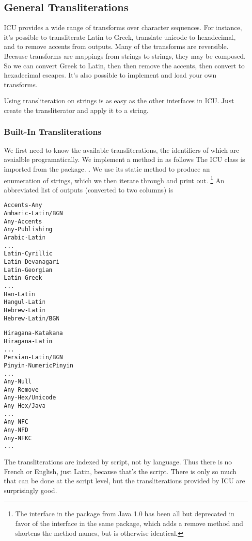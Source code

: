 \subsection{General Transliterations}\label{section:char-unicode-transliterate}

ICU provides a wide range of transforms over character sequences.  For
instance, it's possible to transliterate Latin to Greek, translate
unicode to hexadecimal, and to remove accents from outputs.  Many of
the transforms are reversible.  Because transforms are mappings from
strings to strings, they may be composed.  So we can convert Greek to
Latin, then then remove the accents, then convert to hexadecimal
escapes.  It's also possible to implement and load your own transforms.

Using transliteration on strings is as easy as the other interfaces in
ICU.  Just create the transliterator and apply it to a string.  

\subsubsection{Built-In Transliterations}

We first need to know the available transliterations, the identifiers
of which are avaialble programatically.  We implement a 
method in  as follows
%
%
The ICU  class is imported from the package.
.  We use its static method 
to produce an enumeration of strings, which we then iterate through
and print out.%
%
\footnote{The  interface in the package  
from Java 1.0 has been all but deprecated in favor of the
 interface in the same package, which adds a remove
method and shortens the method names, but is otherwise identical.}
%
An abbreviated list of outputs (converted to two columns) is
%
\begin{trivlist}
\item
\begin{minipage}[t]{0.45\textwidth}
\begin{verbatim}
Accents-Any
Amharic-Latin/BGN
Any-Accents
Any-Publishing
Arabic-Latin
...
Latin-Cyrillic
Latin-Devanagari
Latin-Georgian
Latin-Greek
...
Han-Latin
Hangul-Latin
Hebrew-Latin
Hebrew-Latin/BGN
\end{verbatim}
\end{minipage}%
\begin{minipage}[t]{0.45\textwidth}
\begin{verbatim}
Hiragana-Katakana
Hiragana-Latin
...
Persian-Latin/BGN
Pinyin-NumericPinyin
...
Any-Null
Any-Remove
Any-Hex/Unicode
Any-Hex/Java
...
Any-NFC
Any-NFD
Any-NFKC
...
\end{verbatim}
\end{minipage}
\end{trivlist}
%
The transliterations are indexed by script, not by language.  Thus
there is no French or English, just Latin, because that's the script.
There is only so much that can be done at the script level, but the
transliterations provided by ICU are surprisingly good.  

